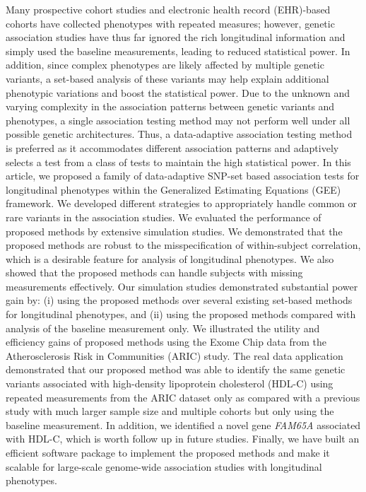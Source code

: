 \documentclass[12pt]{article}
\begin{document}
Many prospective cohort studies and electronic health record (EHR)-based cohorts have collected phenotypes with repeated measures; however, genetic association studies have thus far ignored the rich longitudinal information and simply used the baseline measurements, leading to reduced statistical power. In addition, since complex phenotypes are likely affected by multiple genetic variants, a set-based analysis of these variants may help explain additional phenotypic variations and boost the statistical power. Due to the unknown and varying complexity in the association patterns between genetic variants and phenotypes, a single association testing method may not perform well under all possible genetic architectures. Thus, a data-adaptive association testing method is preferred as it accommodates different association patterns and adaptively selects a test from a class of tests to maintain the high statistical power. In this article, we proposed a family of data-adaptive SNP-set based association tests for longitudinal phenotypes within the Generalized Estimating Equations (GEE) framework. We developed different strategies to appropriately handle common or rare variants in the association studies. We evaluated the performance of proposed methods by extensive simulation studies. We demonstrated that the proposed methods are robust to the misspecification of within-subject correlation, which is a desirable feature for analysis of longitudinal phenotypes. We also showed that the proposed methods can handle subjects with missing measurements effectively. Our simulation studies demonstrated substantial power gain by: (i) using the proposed methods over several existing set-based methods for longitudinal phenotypes, and (ii) using the proposed methods compared with analysis of the  baseline measurement only. We illustrated the utility and efficiency gains of proposed methods using the Exome Chip data from the Atherosclerosis Risk in Communities (ARIC) study. The real data application demonstrated that our proposed method was able to identify the same genetic variants associated with high-density lipoprotein cholesterol (HDL-C) using repeated measurements from the ARIC dataset only as compared with a previous study with much larger sample size and multiple cohorts but only using the baseline measurement. In addition, we identified a novel gene \textit{FAM65A} associated with HDL-C, which is worth follow up in future studies. Finally, we have built an efficient software package to implement the proposed methods and make it scalable for large-scale genome-wide association studies with longitudinal phenotypes.
\end{document}
